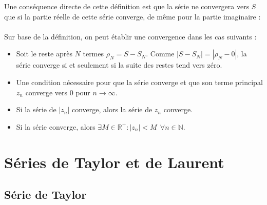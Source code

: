 	Une conséquence directe de cette définition est que la série ne convergera vers $S$ que si
	la partie réelle de cette série converge, de même pour la partie imaginaire : \\
	
	\ \\
	
	Sur base de la définition, on peut établir une convergence dans les cas suivants :
	\begin{itemize}
	\item Soit le reste après $N$ termes $\rho_N = S-S_N$. Comme $|S-S_N| = |\rho_N - 0|$, la 
	série converge si et seulement si la suite des restes tend vers zéro.
	\item Une condition nécessaire pour que la série converge et que son terme principal $z_n$
	converge vers 0 pour $n\rightarrow\infty$.
	\item Si la série de $|z_n|$ converge, alors la série de $z_n$ converge.
	\item Si la série converge, alors $\exists M \in \mathbb{R}^+ : |z_n|<M\ \ \forall n \in 
	\mathbb{N}$.
	\end{itemize}
\section{Séries de Taylor et de Laurent}
	\subsection{Série de Taylor}
	\ \\
	
